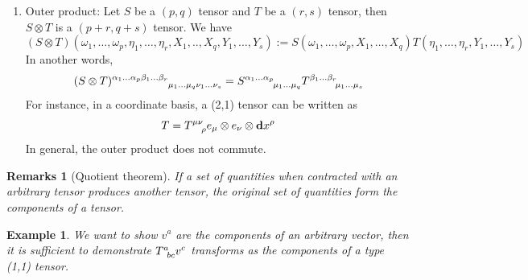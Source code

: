 \documentclass[a4paper]{article}
\newtheorem{eg}{Example}[section]
\newtheorem{remarks}{Remarks}[section]
\theoremstyle{new}
\begin{document}
\begin{enumerate}
    \item Outer product: Let $S$ be a $(p,q)$ tensor and $T$ be a $(r,s)$ tensor, then $S\otimes T$ is a $(p+r,q+s)$ tensor. We have
    $$(S\otimes T)(\omega_1,\dots ,\omega_p,\eta_1,\dots ,\eta_r,X_1,..,X_q,Y_1,\dots ,Y_s):=S(\omega_1,\dots ,\omega_p,X_1,\dots ,X_q)T(\eta_1,\dots ,\eta_r,Y_1,\dots ,Y_s)$$
    In another words,
    $$\tensor*{(S\otimes T)}{*_{}^{\alpha_1\dots \alpha_p\beta_1\dots \beta_r}_{\mu_1\dots \mu_q\nu_1\dots \nu_s}}=\tensor*{S}{*_{}^{\alpha_1\dots \alpha_p}_{\mu_1\dots \mu_q}}\tensor*{T}{*_{}^{\beta_1\dots \beta_r}_{\mu_1\dots \mu_s}}$$
    For instance, in  a coordinate basis, a (2,1) tensor can be written as
        $$T=\tensor*{T}{*_{}^{\mu\nu}_{\rho}}e_\mu\otimes e_\nu\otimes\mathbf{d}x^\rho$$
        In general, the outer product does not commute.
\end{enumerate}
\begin{remarks}[Quotient theorem]
If a set of quantities when contracted with an arbitrary tensor produces another tensor, the original set of quantities form the components of a tensor.
\end{remarks}
\begin{eg}
We want to show $v^a$ are the components of an arbitrary vector, then it is sufficient to demonstrate $\tensor*{T}{*_{}^{a}_{bc}}v^c$ transforms as the components of a type (1,1) tensor.
\end{eg}
\end{document}
